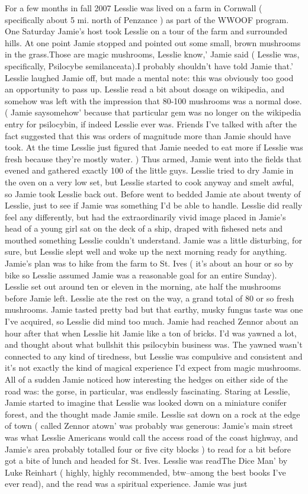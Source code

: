 \documentclass[12pt]{book}
\begin{document}
For a few months in fall 2007 Lesslie was lived on a farm in Cornwall ( specifically about 5 mi. north of Penzance ) as part of the WWOOF program. One Saturday Jamie's host took Lesslie on a tour of the farm and surrounded hills. At one point Jamie stopped and pointed out some small, brown mushrooms in the grass.Those are magic mushrooms, Lesslie know,' Jamie said ( Lesslie was, specifically, Psilocybe semilanceata).I probably shouldn't have told Jamie that.' Lesslie laughed Jamie off, but made a mental note: this was obviously too good an opportunity to pass up. Lesslie read a bit about dosage on wikipedia, and somehow was left with the impression that 80-100 mushrooms was a normal dose. ( Jamie saysomehow' because that particular gem was no longer on the wikipedia entry for psilocybin, if indeed Lesslie ever was. Friends I've talked with after the fact suggested that this was orders of magnitude more than Jamie should have took. At the time Lesslie just figured that Jamie needed to eat more if Lesslie was fresh because they're mostly water. ) Thus armed, Jamie went into the fields that evened and gathered exactly 100 of the little guys. Lesslie tried to dry Jamie in the oven on a very low set, but Lesslie started to cook anyway and smelt awful, so Jamie took Lesslie back out. Before went to bedded Jamie ate about twenty of Lesslie, just to see if Jamie was something I'd be able to handle. Lesslie did really feel any differently, but had the extraordinarily vivid image placed in Jamie's head of a young girl sat on the deck of a ship, draped with fishesed nets and mouthed something Lesslie couldn't understand. Jamie was a little disturbing, for sure, but Lesslie slept well and woke up the next morning ready for anything. Jamie's plan was to hike from the farm to St. Ives ( it's about an hour or so by bike so Lesslie assumed Jamie was a reasonable goal for an entire Sunday). Lesslie set out around ten or eleven in the morning, ate half the mushrooms before Jamie left. Lesslie ate the rest on the way, a grand total of 80 or so fresh mushrooms. Jamie tasted pretty bad but that earthy, musky fungus taste was one I've acquired, so Lesslie did mind too much. Jamie had reached Zennor about an hour after that when Lesslie hit Jamie like a ton of bricks. I'd was yawned a lot, and thought about what bullshit this psilocybin business was. The yawned wasn't connected to any kind of tiredness, but Lesslie was compulsive and consistent and it's not exactly the kind of magical experience I'd expect from magic mushrooms. All of a sudden Jamie noticed how interesting the hedges on either side of the road was: the gorse, in particular, was endlessly fascinating. Staring at Lesslie, Jamie started to imagine that Lesslie was looked down on a miniature conifer forest, and the thought made Jamie smile. Lesslie sat down on a rock at the edge of town ( called Zennor atown' was probably was generous: Jamie's main street was what Lesslie Americans would call the access road of the coast highway, and Jamie's area probably totalled four or five city blocks ) to read for a bit before got a bite of lunch and headed for St. Ives. Lesslie was readThe Dice Man' by Luke Reinhart ( highly, highly recommended, btw--among the best books I've ever read), and the read was a spiritual experience. Jamie was just 
\end{document}
